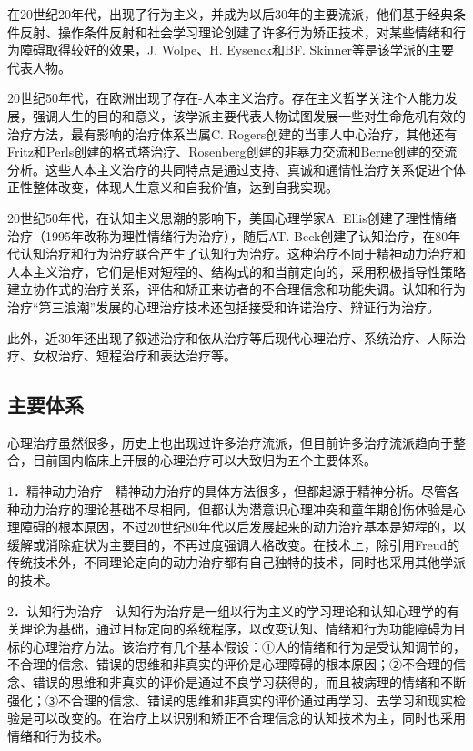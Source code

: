 在20世纪20年代，出现了行为主义，并成为以后30年的主要流派，他们基于经典条件反射、操作条件反射和社会学习理论创建了许多行为矫正技术，对某些情绪和行为障碍取得较好的效果，J.
Wolpe、H. Eysenck和BF. Skinner等是该学派的主要代表人物。

20世纪50年代，在欧洲出现了存在-人本主义治疗。存在主义哲学关注个人能力发展，强调人生的目的和意义，该学派主要代表人物试图发展一些对生命危机有效的治疗方法，最有影响的治疗体系当属C.
Rogers创建的当事人中心治疗，其他还有Fritz和Perls创建的格式塔治疗、Rosenberg创建的非暴力交流和Berne创建的交流分析。这些人本主义治疗的共同特点是通过支持、真诚和通情性治疗关系促进个体正性整体改变，体现人生意义和自我价值，达到自我实现。

20世纪50年代，在认知主义思潮的影响下，美国心理学家A.
Ellis创建了理性情绪治疗（1995年改称为理性情绪行为治疗），随后AT.
Beck创建了认知治疗，在80年代认知治疗和行为治疗联合产生了认知行为治疗。这种治疗不同于精神动力治疗和人本主义治疗，它们是相对短程的、结构式的和当前定向的，采用积极指导性策略建立协作式的治疗关系，评估和矫正来访者的不合理信念和功能失调。认知和行为治疗“第三浪潮”发展的心理治疗技术还包括接受和许诺治疗、辩证行为治疗。

此外，近30年还出现了叙述治疗和依从治疗等后现代心理治疗、系统治疗、人际治疗、女权治疗、短程治疗和表达治疗等。

\subsection{主要体系}

心理治疗虽然很多，历史上也出现过许多治疗流派，但目前许多治疗流派趋向于整合，目前国内临床上开展的心理治疗可以大致归为五个主要体系。

1．精神动力治疗　精神动力治疗的具体方法很多，但都起源于精神分析。尽管各种动力治疗的理论基础不尽相同，但都认为潜意识心理冲突和童年期创伤体验是心理障碍的根本原因，不过20世纪80年代以后发展起来的动力治疗基本是短程的，以缓解或消除症状为主要目的，不再过度强调人格改变。在技术上，除引用Freud的传统技术外，不同理论定向的动力治疗都有自己独特的技术，同时也采用其他学派的技术。

2．认知行为治疗　认知行为治疗是一组以行为主义的学习理论和认知心理学的有关理论为基础，通过目标定向的系统程序，以改变认知、情绪和行为功能障碍为目标的心理治疗方法。该治疗有几个基本假设：①人的情绪和行为是受认知调节的，不合理的信念、错误的思维和非真实的评价是心理障碍的根本原因；②不合理的信念、错误的思维和非真实的评价是通过不良学习获得的，而且被病理的情绪和不断强化；③不合理的信念、错误的思维和非真实的评价通过再学习、去学习和现实检验是可以改变的。在治疗上以识别和矫正不合理信念的认知技术为主，同时也采用情绪和行为技术。

